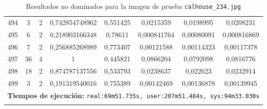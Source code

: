 \begin{longtable}{|c|c|c|c|c|c|c|c|}
494 & 3 & 2 & 0,742854748962 & 0,551425 & 0,0215359 & 0,0198995 & 0,0208231  \\
495 & 6 & 2 & 0,218903166348 & 0,78611 & 0,000841764 & 0,00080091 & 0,000816869  \\
496 & 7 & 2 & 0,256885268989 & 0,773407 & 0,00121588 & 0,00114323 & 0,00117378  \\
497 & 36 & 4 & 1 & 0,445821 & 0,0866204 & 0,0792098 & 0,0816776  \\
498 & 18 & 2 & 0,874787137556 & 0,533793 & 0,0238637 & 0,022623 & 0,0232914  \\
499 & 3 & 2 & 0,191319540016 & 0,755389 & 0,00142469 & 0,00136878 & 0,00139945  \\
\hline
\multicolumn{8}{|c|}{\textbf{Tiempos de ejecución:} \texttt{real:69m51.735s, user:207m51.484s, sys:94m33.030s}}\\  \hline
\caption{Resultados no dominados para la imagen de prueba \texttt{calhouse\_234.jpg}}
\label{tab:calhouse_234}
\end{longtable}
\normalsize


